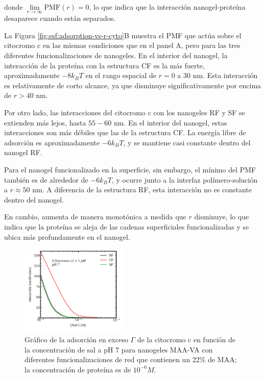donde $\lim\limits_{r\to \infty}\text{PMF}(r)=0$, lo que indica que la interacci\'on nanogel-prote\'ina desaparece cuando est\'an separados.

La Figura \ref{fig:esf:adsorption-vs-r-cyto}B muestra el PMF que act\'ua sobre el citocromo c en las mismas condiciones que en el panel A, pero para las tres diferentes funcionalizaciones de nanogeles. En el interior del nanogel, la interacci\'on de la prote\'ina con la estructura CF es la m\'as fuerte, aproximadamente $-8k_B T$ en el rango espacial de $r=0$ a 30 nm. Esta interacci\'on es relativamente de corto alcance, ya que disminuye significativamente por encima de $r > 40$ nm.

Por otro lado, las interacciones del citocromo c con los nanogeles RF y SF se extienden m\'as lejos, hasta $55-60$ nm. En el interior del nanogel, estas interacciones son m\'as d\'ebiles que las de la estructura CF. La energ\'ia libre de adsorci\'on es aproximadamente $-6 k_BT$, y se mantiene casi constante dentro del nanogel RF.

Para el nanogel funcionalizado en la superficie, sin embargo, el m\'inimo del PMF tambi\'en es de alrededor de $-6 k_BT$, y ocurre junto a la interfaz pol\'imero-soluci\'on a $r\approx 50$ nm. A diferencia de la estructura RF, esta interacci\'on no es constante dentro del nanogel. 

En cambio, aumenta de manera monot\'onica a medida que $r$ disminuye, lo que indica que la prote\'ina se aleja de las cadenas superficiales funcionalizadas y se ubica m\'as profundamente en el nanogel.




\begin{figure}[!htb]
     \centering
     \includegraphics[width=0.45\textwidth]{Figures/graphs-gel2/gamma-salts-cito.pdf}
     \caption{Gr\'afico de la adsorci\'on en exceso $\Gamma$ de la citocromo c en funci\'on de la concentraci\'on de sal a pH 7 para nanogeles MAA-VA con diferentes funcionalizaciones de red que contienen un 22\% de MAA; la concentraci\'on de prote\'ina es de $10^{-6}M$.}
     \label{fig:esf:adsorption-vs-salt-cyto}
 \end{figure}
 

